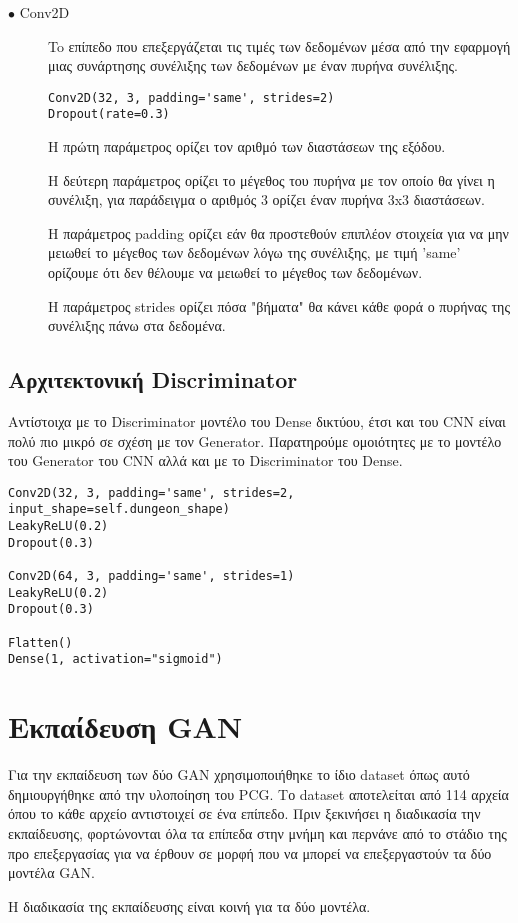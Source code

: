 \begin{description}
\item[$\bullet$ Conv2D] To επίπεδο που επεξεργάζεται τις τιμές των δεδομένων μέσα από την εφαρμογή μιας συνάρτησης συνέλιξης των δεδομένων με έναν πυρήνα συνέλιξης. \cite{conv2d}
\par
\begin{verbatim}
Conv2D(32, 3, padding='same', strides=2)
Dropout(rate=0.3)
\end{verbatim}
\par
Η πρώτη παράμετρος ορίζει τον αριθμό των διαστάσεων της εξόδου.
\par
Η δεύτερη παράμετρος ορίζει το μέγεθος του πυρήνα με τον οποίο θα γίνει η συνέλιξη, για παράδειγμα ο αριθμός 3 ορίζει έναν πυρήνα 3x3 διαστάσεων.
\par
H παράμετρος padding ορίζει εάν θα προστεθούν επιπλέον στοιχεία για να μην μειωθεί το μέγεθος των δεδομένων λόγω της συνέλιξης, με τιμή 'same' ορίζουμε ότι δεν θέλουμε να μειωθεί το μέγεθος των δεδομένων.
\par
H παράμετρος strides ορίζει πόσα "βήματα" θα κάνει κάθε φορά ο πυρήνας της συνέλιξης πάνω στα δεδομένα.
\end{description}


\subsection{Αρχιτεκτονική Discriminator}
Αντίστοιχα με το Discriminator μοντέλο του Dense δικτύου, έτσι και του CNN είναι πολύ πιο μικρό σε σχέση με τον Generator. Παρατηρούμε ομοιότητες με το μοντέλο του Generator του CNN αλλά και με το Discriminator του Dense.

\begin{verbatim}
Conv2D(32, 3, padding='same', strides=2, input_shape=self.dungeon_shape)
LeakyReLU(0.2)
Dropout(0.3)

Conv2D(64, 3, padding='same', strides=1)
LeakyReLU(0.2)
Dropout(0.3)

Flatten()
Dense(1, activation="sigmoid")

\end{verbatim}


\section{Εκπαίδευση GAN}
Για την εκπαίδευση των δύο GAN χρησιμοποιήθηκε το ίδιο dataset όπως αυτό δημιουργήθηκε από την υλοποίηση του PCG. Το dataset αποτελείται από 114 αρχεία όπου το κάθε αρχείο αντιστοιχεί σε ένα επίπεδο. Πριν ξεκινήσει η διαδικασία την εκπαίδευσης, φορτώνονται όλα τα επίπεδα στην μνήμη και περνάνε από το στάδιο της προ επεξεργασίας για να έρθουν σε μορφή που να μπορεί να επεξεργαστούν τα δύο μοντέλα GAN.
\par
Η διαδικασία της εκπαίδευσης είναι κοινή για τα δύο μοντέλα.


